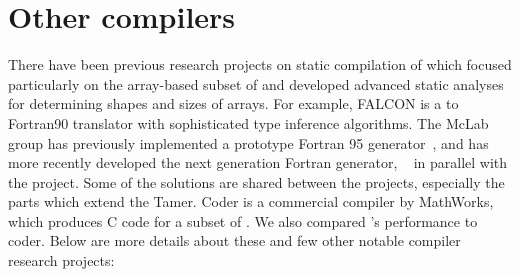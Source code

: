 \section{Other \matlab compilers}
There have been  previous research projects on static compilation of
\matlab which focused particularly on the array-based subset of \matlab
and developed advanced static analyses for determining shapes and sizes
of arrays.  For example, FALCON \cite{falcon} is a \matlab to {\sc
Fortran90} translator with sophisticated type inference algorithms.
The McLab group has previously implemented a prototype Fortran 95
generator~\cite{McForThesis}, and has more recently developed the next generation
Fortran generator, \mctwofor~\cite{mc2for} in parallel with the \mixten project.   Some of the
solutions are shared between the projects, especially the parts which
extend the Tamer. \matlab Coder is a commercial compiler by MathWorks\cite{MATLABCoder},
which produces C code for a subset of \matlab. We also compared \mixten's
performance to \matlab coder. Below are more details about these and few other
notable \matlab compiler research projects:
